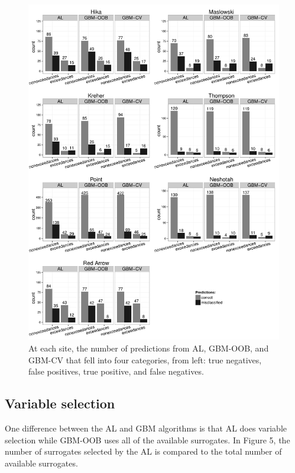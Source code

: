 \documentclass[authoryear,review, 12pt]{elsarticle}
\begin{document}
\begin{figure}
\includegraphics[width=\textwidth]{fig4/truepos.pdf}
\caption{At each site, the number of predictions from AL, GBM-OOB, and
GBM-CV that fell into four categories, from left: true negatives, false
positives, true positive, and false negatives.}
\end{figure}

\subsection{Variable selection}\label{covariate-selection}

One difference between the AL and GBM algorithms is that AL does
variable selection while GBM-OOB uses all of the available surrogates.
In Figure 5, the number of surrogates selected by the AL is compared to the total number of available surrogates.
\end{document}
